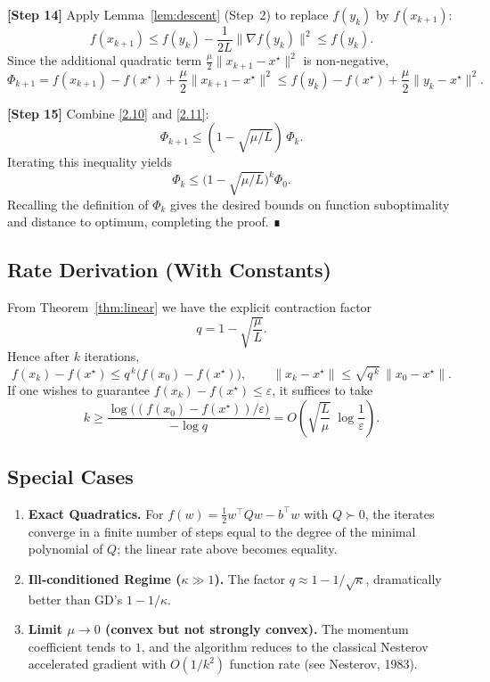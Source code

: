 \documentclass[11pt]{article}
\begin{document}
\noindent\textbf{[Step 14]}  Apply Lemma~\ref{lem:descent} (Step~2) to replace $f(y_k)$ by $f(x_{k+1})$:
\[
    f(x_{k+1})\le f(y_k)-\frac{1}{2L}\|\nabla f(y_k)\|^2
    \le f(y_k) .
\]
Since the additional quadratic term $\frac{\mu}{2}\|x_{k+1}-x^\star\|^2$ is non‑negative,
\[
    \Phi_{k+1}=f(x_{k+1})-f(x^\star)+\frac{\mu}{2}\|x_{k+1}-x^\star\|^2
    \le f(y_k)-f(x^\star)+\frac{\mu}{2}\|y_k-x^\star\|^2 .
\tag{2.11}
\]

\noindent\textbf{[Step 15]}  Combine \eqref{2.10} and \eqref{2.11}:
\[
    \Phi_{k+1}\le (1-\sqrt{\mu/L})\,\Phi_k .
\]
Iterating this inequality yields
\[
    \Phi_k \le \bigl(1-\sqrt{\mu/L}\bigr)^k \Phi_0 .
\]
Recalling the definition of $\Phi_k$ gives the desired bounds on function suboptimality and distance to optimum, completing the proof. ∎

\subsection*{Rate Derivation (With Constants)}
From Theorem~\ref{thm:linear} we have the explicit contraction factor
\[
    q = 1-\sqrt{\frac{\mu}{L}}.
\]
Hence after $k$ iterations,
\[
    f(x_k)-f(x^\star) \le q^{\,k}\bigl(f(x_0)-f(x^\star)\bigr),
\qquad
    \|x_k-x^\star\| \le \sqrt{q^{\,k}}\,\|x_0-x^\star\|.
\]
If one wishes to guarantee $f(x_k)-f(x^\star)\le\varepsilon$, it suffices to take
\[
    k \ge \frac{\log\bigl((f(x_0)-f(x^\star))/\varepsilon\bigr)}{-\log q}
    = O\!\left(\sqrt{\frac{L}{\mu}}\;\log\frac{1}{\varepsilon}\right).
\]

\subsection*{Special Cases}
\begin{enumerate}[label=\arabic*)]
\item \textbf{Exact Quadratics.} For $f(w)=\frac12 w^\top Q w - b^\top w$ with $Q\succ0$, the iterates converge in a finite number of steps equal to the degree of the minimal polynomial of $Q$; the linear rate above becomes equality.
\item \textbf{Ill‑conditioned Regime ($\kappa\gg1$).} The factor $q\approx 1-1/\sqrt{\kappa}$, dramatically better than GD’s $1-1/\kappa$.
\item \textbf{Limit $\mu\to 0$ (convex but not strongly convex).} The momentum coefficient tends to $1$, and the algorithm reduces to the classical Nesterov accelerated gradient with $O(1/k^2)$ function rate (see Nesterov, 1983).
\end{enumerate}
\end{document}

